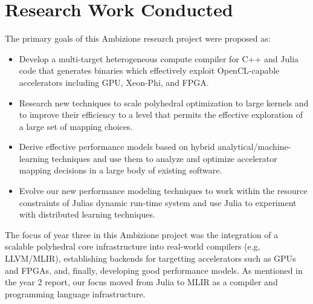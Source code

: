 \documentclass[11pt, manuscript,\review anonymous]{acmart}
\begin{document}
\maketitle
\newpage
\ifx\grammarly\grammarlyon 
\onecolumn 
\else 
\fi


\section{Research Work Conducted}

The primary goals of this Ambizione research project were proposed as:
\begin{itemize}
\item Develop a multi-target heterogeneous compute compiler for C++ and Julia code that generates binaries which effectively exploit
OpenCL-capable accelerators including GPU, Xeon-Phi, and FPGA.
\item Research new techniques to scale polyhedral optimization to large kernels and to improve their efficiency to a level that permits
the effective exploration of a large set of mapping choices.
\item Derive effective performance models based on hybrid analytical/machine-learning techniques and use them to analyze and optimize accelerator mapping decisions in a large body of existing software.
\item Evolve our new performance modeling techniques to work within the resource constraints of Julias dynamic run-time system and use Julia to experiment with distributed learning techniques.
\end{itemize}

The focus of year three in this Ambizione project was the integration of a scalable
polyhedral core infrastructure into real-world compilers (e.g, LLVM/MLIR),
establishing backends for targetting accelerators such as GPUs and FPGAs, and,
finally, developing good performance models. As mentioned in the year 2
report, our focus moved from Julia to MLIR as a compiler and programming
language infrastructure.
\end{document}
